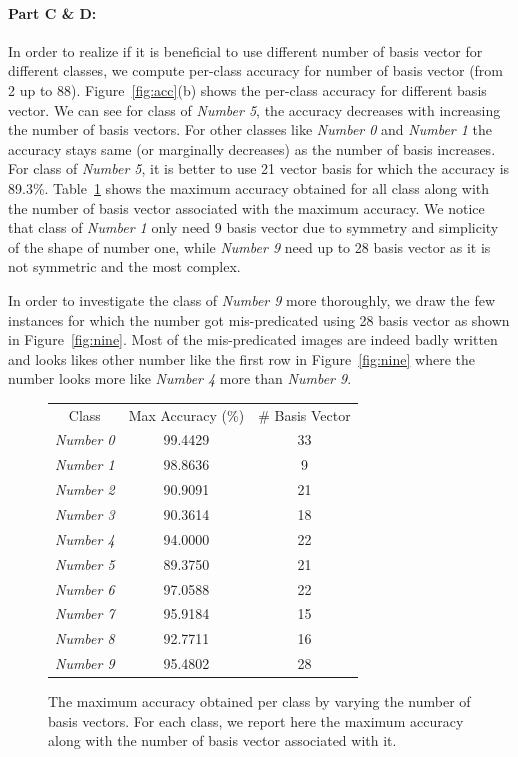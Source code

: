 \paragraph{Part C \& D:}
In order to realize if it is beneficial to use different number of basis vector for different classes, we compute per-class accuracy for number of basis vector (from 2 up to 88). Figure~\ref{fig:acc}(b) shows the per-class accuracy for different basis vector. We can see for class of \textit{Number 5}, the accuracy decreases with increasing the number of basis vectors. For other classes like \textit{Number 0} and \textit{Number 1} the accuracy stays same (or marginally decreases) as the number of basis increases. For class of \textit{Number 5}, it is better to use 21 vector basis for which the accuracy is  89.3\%. Table~\ref{tab:acc} shows the maximum accuracy obtained for all class along with the number of basis vector associated with the maximum accuracy. We notice that class of \textit{Number 1} only need 9 basis vector due to symmetry and simplicity of the shape of number one, while \textit{Number 9} need up to 28 basis vector as it is not symmetric and the most complex. 

In order to investigate the class of \textit{Number 9} more thoroughly, we draw the few instances for which the number got mis-predicated using 28 basis vector as shown in Figure~\ref{fig:nine}. Most of the mis-predicated images are indeed badly written and looks likes other number like the first row in Figure~\ref{fig:nine} where the number looks more like \textit{Number 4} more than \textit{Number 9}.


\begin{figure}[tbh]
 \centering    
\begin{tabular}{ |c||c|c|}
 \hline
Class &  Max Accuracy (\%) &  \# Basis Vector   \\ \hhline{|=|=|=|}
 \hline
 \textit{Number 0}   & 99.4429 & 33\\
 \textit{Number 1}   & 98.8636 & 9 \\
 \textit{Number 2}   & 90.9091 & 21\\
 \textit{Number 3}   & 90.3614 & 18\\
 \textit{Number 4}   & 94.0000 & 22\\
 \textit{Number 5}   & 89.3750 & 21\\
 \textit{Number 6}   & 97.0588 & 22\\     
 \textit{Number 7}   & 95.9184 & 15\\
 \textit{Number 8}   & 92.7711 & 16\\
 \textit{Number 9}   & 95.4802 & 28\\      
 \hline
\end{tabular} 
\caption{The maximum accuracy obtained per class by varying the number of basis vectors. For each class, we report here the maximum accuracy along with the number of basis vector associated with it.}
   \label{tab:acc}
\end{figure} 



